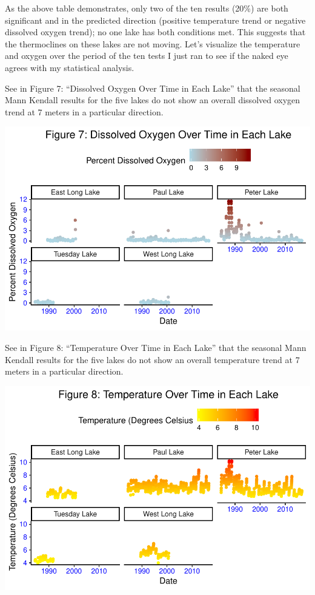 \documentclass[12pt,]{article}
\begin{document}
As the above table demonstrates, only two of the ten results (20\%) are
both significant and in the predicted direction (positive temperature
trend or negative dissolved oxygen trend); no one lake has both
conditions met. This suggests that the thermoclines on these lakes are
not moving. Let's visualize the temperature and oxygen over the period
of the ten tests I just ran to see if the naked eye agrees with my
statistical analysis.

See in Figure 7: ``Dissolved Oxygen Over Time in Each Lake'' that the
seasonal Mann Kendall results for the five lakes do not show an overall
dissolved oxygen trend at 7 meters in a particular direction.

\includegraphics{KBollt_ENV872_FinalProject_files/figure-latex/smk oxygen visualization-1.pdf}

See in Figure 8: ``Temperature Over Time in Each Lake'' that the
seasonal Mann Kendall results for the five lakes do not show an overall
temperature trend at 7 meters in a particular direction.

\includegraphics{KBollt_ENV872_FinalProject_files/figure-latex/smk temperature visualization-1.pdf}
\end{document}
